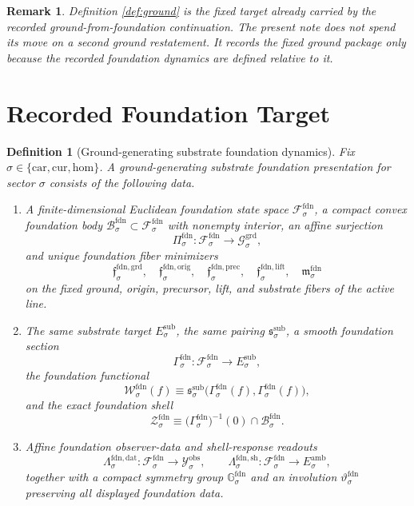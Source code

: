 \documentclass[11pt]{article}
\newcommand{\Car}{\mathrm{car}}
\newcommand{\Cur}{\mathrm{cur}}
\newcommand{\Hom}{\mathrm{hom}}
\newcommand{\DataSpace}[1]{\mathcal Y_{#1}^{\mathrm{obs}}}
\newcommand{\AmbientTarget}[1]{E_{#1}^{\mathrm{amb}}}
\newcommand{\SubTarget}[1]{E_{#1}^{\mathrm{sub}}}
\newcommand{\SubPair}[1]{\mathfrak s_{#1}^{\mathrm{sub}}}
\newcommand{\GroundSpace}[1]{\mathcal G_{#1}^{\mathrm{grd}}}
\newcommand{\FoundSpace}[1]{\mathcal F_{#1}^{\mathrm{fdn}}}
\newcommand{\FoundBody}[1]{\mathcal B_{#1}^{\mathrm{fdn}}}
\newcommand{\FoundProj}[1]{\Pi_{#1}^{\mathrm{fdn}}}
\newcommand{\FoundGroundMin}[1]{\mathfrak f_{#1}^{\mathrm{fdn,grd}}}
\newcommand{\FoundOrigMin}[1]{\mathfrak f_{#1}^{\mathrm{fdn,orig}}}
\newcommand{\FoundPrecMin}[1]{\mathfrak f_{#1}^{\mathrm{fdn,prec}}}
\newcommand{\FoundLiftMin}[1]{\mathfrak f_{#1}^{\mathrm{fdn,lift}}}
\newcommand{\FoundSubMin}[1]{\mathfrak m_{#1}^{\mathrm{fdn}}}
\newcommand{\FoundSection}[1]{\Gamma_{#1}^{\mathrm{fdn}}}
\newcommand{\FoundFunctional}[1]{\mathscr W_{#1}^{\mathrm{fdn}}}
\newcommand{\FoundData}[1]{\Lambda_{#1}^{\mathrm{fdn,dat}}}
\newcommand{\FoundShellMap}[1]{\Lambda_{#1}^{\mathrm{fdn,sh}}}
\newcommand{\FoundSym}[1]{\mathbb G_{#1}^{\mathrm{fdn}}}
\newcommand{\FoundTime}[1]{\vartheta_{#1}^{\mathrm{fdn}}}
\newcommand{\FoundShellSet}[1]{\mathcal Z_{#1}^{\mathrm{fdn}}}
\newtheorem{definition}{Definition}
\newtheorem{remark}{Remark}
\begin{document}
\begin{remark}
Definition \ref{def:ground} is the fixed target already carried by the recorded ground-from-foundation continuation. The present note does not spend its move on a second ground restatement. It records the fixed ground package only because the recorded foundation dynamics are defined relative to it.
\end{remark}

\section{Recorded Foundation Target}

\begin{definition}[Ground-generating substrate foundation dynamics]
\label{def:foundation}
Fix \(\sigma\in\{\Car,\Cur,\Hom\}\). A ground-generating substrate foundation presentation for sector \(\sigma\) consists of the following data.
\begin{enumerate}
    \item A finite-dimensional Euclidean foundation state space \(\FoundSpace{\sigma}\), a compact convex foundation body \(\FoundBody{\sigma}\subset\FoundSpace{\sigma}\) with nonempty interior, an affine surjection
    \[
    \FoundProj{\sigma}:\FoundSpace{\sigma}\to\GroundSpace{\sigma},
    \]
    and unique foundation fiber minimizers
    \[
    \FoundGroundMin{\sigma},\quad
    \FoundOrigMin{\sigma},\quad
    \FoundPrecMin{\sigma},\quad
    \FoundLiftMin{\sigma},\quad
    \FoundSubMin{\sigma}
    \]
    on the fixed ground, origin, precursor, lift, and substrate fibers of the active line.
    \item The same substrate target \(\SubTarget{\sigma}\), the same pairing \(\SubPair{\sigma}\), a smooth foundation section
    \[
    \FoundSection{\sigma}:\FoundSpace{\sigma}\to\SubTarget{\sigma},
    \]
    the foundation functional
    \[
    \FoundFunctional{\sigma}(f)
    \equiv
    \SubPair{\sigma}\bigl(\FoundSection{\sigma}(f),\FoundSection{\sigma}(f)\bigr),
    \]
    and the exact foundation shell
    \[
    \FoundShellSet{\sigma}
    \equiv
    \bigl(\FoundSection{\sigma}\bigr)^{-1}(0)\cap\FoundBody{\sigma}.
    \]
    \item Affine foundation observer-data and shell-response readouts
    \[
    \FoundData{\sigma}:\FoundSpace{\sigma}\to\DataSpace{\sigma},
    \qquad
    \FoundShellMap{\sigma}:\FoundSpace{\sigma}\to\AmbientTarget{\sigma},
    \]
    together with a compact symmetry group \(\FoundSym{\sigma}\) and an involution \(\FoundTime{\sigma}\) preserving all displayed foundation data.

\end{enumerate}
\end{definition}
\end{document}
